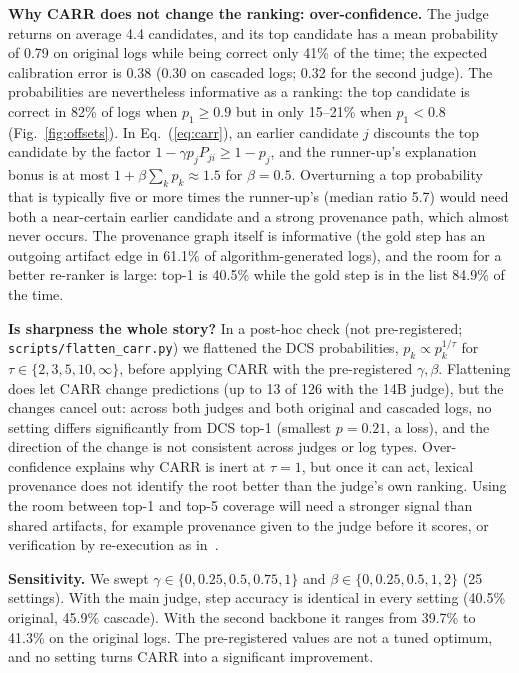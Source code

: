 \documentclass[conference]{IEEEtran}
\begin{document}


\textbf{Why CARR does not change the ranking: over-confidence.} The judge returns on average 4.4 candidates, and its top candidate has a mean probability of 0.79 on original logs while being correct only 41\% of the time; the expected calibration error is 0.38 (0.30 on cascaded logs; 0.32 for the second judge). The probabilities are nevertheless informative as a ranking: the top candidate is correct in 82\% of logs when $p_1\ge0.9$ but in only 15--21\% when $p_1<0.8$ (Fig.~\ref{fig:offsets}). In Eq.~(\ref{eq:carr}), an earlier candidate $j$ discounts the top candidate by the factor $1-\gamma p_jP_{ji}\ge 1-p_j$, and the runner-up's explanation bonus is at most $1+\beta\sum_k p_k\approx1.5$ for $\beta=0.5$. Overturning a top probability that is typically five or more times the runner-up's (median ratio 5.7) would need both a near-certain earlier candidate and a strong provenance path, which almost never occurs. The provenance graph itself is informative (the gold step has an outgoing artifact edge in 61.1\% of algorithm-generated logs), and the room for a better re-ranker is large: top-1 is 40.5\% while the gold step is in the list 84.9\% of the time.

\textbf{Is sharpness the whole story?} In a post-hoc check (not pre-registered; \texttt{scripts/flatten\_carr.py}) we flattened the DCS probabilities, $p_k\propto p_k^{1/\tau}$ for $\tau\in\{2,3,5,10,\infty\}$, before applying CARR with the pre-registered $\gamma,\beta$. Flattening does let CARR change predictions (up to 13 of 126 with the 14B judge), but the changes cancel out: across both judges and both original and cascaded logs, no setting differs significantly from DCS top-1 (smallest $p=0.21$, a loss), and the direction of the change is not consistent across judges or log types. Over-confidence explains why CARR is inert at $\tau=1$, but once it can act, lexical provenance does not identify the root better than the judge's own ranking. Using the room between top-1 and top-5 coverage will need a stronger signal than shared artifacts, for example provenance given to the judge before it scores, or verification by re-execution as in~\cite{ma2025dover,rafi2026falat}.

\textbf{Sensitivity.} We swept $\gamma\in\{0,0.25,0.5,0.75,1\}$ and $\beta\in\{0,0.25,0.5,1,2\}$ (25 settings). With the main judge, step accuracy is identical in every setting (40.5\% original, 45.9\% cascade). With the second backbone it ranges from 39.7\% to 41.3\% on the original logs. The pre-registered values are not a tuned optimum, and no setting turns CARR into a significant improvement.
\end{document}
